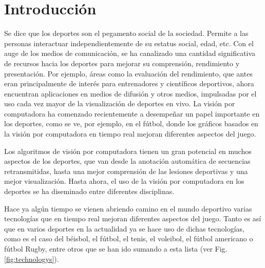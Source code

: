 \chapter*{Introducción}\label{chapter:introduction}

Se dice que los deportes son el pegamento social de la sociedad. Permite a las personas interactuar independientemente de su estatus social, edad, etc. Con el auge de los medios de comunicación, se ha canalizado una cantidad significativa de recursos hacia los deportes para mejorar su comprensión, rendimiento y presentación. Por ejemplo, áreas como la evaluación del rendimiento, que antes eran principalmente de interés para entrenadores y científicos deportivos, ahora encuentran aplicaciones en medios de difusión y otros medios, impulsadas por el uso cada vez mayor de la visualización de deportes en vivo. La visión por computadora ha comenzado recientemente a desempeñar un papel importante en los deportes, como se ve, por ejemplo, en el fútbol, donde los gráficos basados en la visión por computadora en tiempo real mejoran diferentes aspectos del juego.

Los algoritmos de visión por computadora tienen un gran potencial en muchos aspectos de los deportes, que van desde la anotación automática de secuencias retransmitidas, hasta una mejor comprensión de las lesiones deportivas y una mejor visualización. Hasta ahora, el uso de la visión por computadora en los deportes se ha diseminado entre diferentes disciplinas.

Hace ya algún tiempo se vienen abriendo camino en el mundo deportivo varias tecnologías que en tiempo real mejoran diferentes aspectos del juego. Tanto es así que en varios deportes en la actualidad ya se hace uso de dichas tecnologías, como es el caso del béisbol, el fútbol, el tenis, el voleibol, el fútbol americano o fútbol Rugby, entre otros que se han ido sumando a esta lista (ver Fig. \ref{fig:technologys}).

